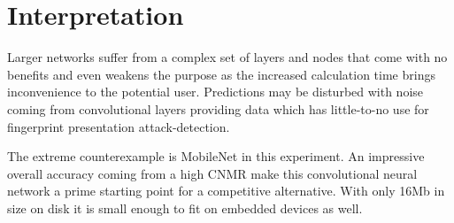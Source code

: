 
\section{Interpretation}
Larger networks suffer from a complex set of layers and nodes that come with no benefits and even weakens the purpose as the increased calculation time brings inconvenience to the potential user.
Predictions may be disturbed with noise coming from convolutional layers providing data which has little-to-no use for fingerprint presentation attack-detection.

\medskip\noindent
The extreme counterexample is MobileNet in this experiment.
An impressive overall accuracy coming from a high CNMR make this convolutional neural network a prime starting point for a competitive alternative.
With only 16Mb in size on disk it is small enough to fit on embedded devices as well.
